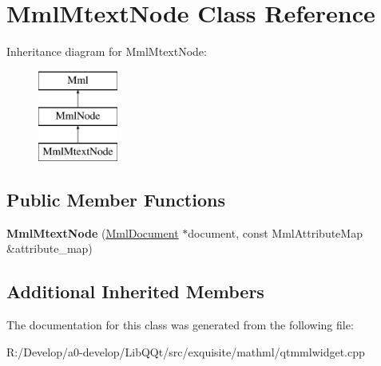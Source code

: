 \hypertarget{class_mml_mtext_node}{}\section{Mml\+Mtext\+Node Class Reference}
\label{class_mml_mtext_node}
Inheritance diagram for Mml\+Mtext\+Node\+:\begin{figure}[H]
\begin{center}
\leavevmode
\includegraphics[height=3.000000cm]{class_mml_mtext_node}
\end{center}
\end{figure}
\subsection*{Public Member Functions}
\begin{DoxyCompactItemize}
\item 
\mbox{\label{class_mml_mtext_node_a18e089d2d14122b8136283a0e81feb04}} 
{\bfseries Mml\+Mtext\+Node} (\mbox{\hyperlink{class_mml_document}{Mml\+Document}} $\ast$document, const Mml\+Attribute\+Map \&attribute\+\_\+map)
\end{DoxyCompactItemize}
\subsection*{Additional Inherited Members}


The documentation for this class was generated from the following file\+:\begin{DoxyCompactItemize}
\item 
R\+:/\+Develop/a0-\/develop/\+Lib\+Q\+Qt/src/exquisite/mathml/qtmmlwidget.\+cpp\end{DoxyCompactItemize}
